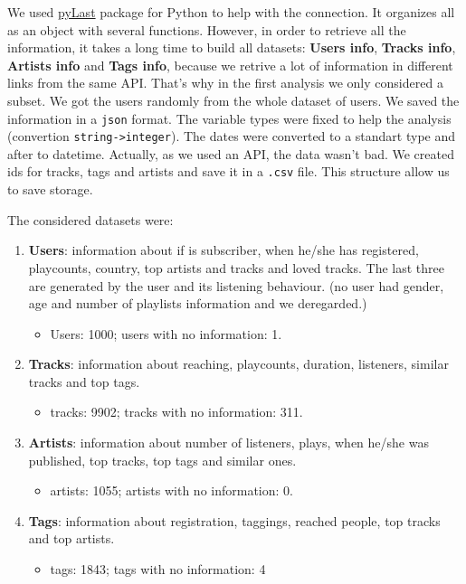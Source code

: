 \documentclass{article}
\begin{document}
We used \href{https://github.com/pylast/pylast}{pyLast}
package for Python to help with the connection. It organizes all as an object
with several functions. However, in order to retrieve all the information, it
takes a long time to build all datasets: \textbf{Users info}, \textbf{Tracks
info}, \textbf{Artists info} and \textbf{Tags info}, because we retrive a lot
of information in different links from the same API. That's why in the first
analysis we only considered a subset. We got the users randomly from the whole
dataset of users. We saved the information in a \lstinline{json} format. The
variable types were fixed to help the analysis (convertion
\lstinline{string->integer}). The dates were converted to a standart type and
after to datetime. Actually, as we used an API, the data wasn't bad. We
created ids for tracks, tags and artists and save it in a \lstinline{.csv}
file. This structure allow us to save storage. 

The considered datasets were: 

\begin{enumerate}
  \item \textbf{Users}: information about if is subscriber, when he/she 
  has registered, playcounts, country, top artists and tracks and loved
  tracks. The last three are generated by the user and its listening behaviour. (no user had gender, age and number of playlists information and
  we deregarded.) 
  \begin{itemize}
    \item Users: 1000; users with no information: 1.
  \end{itemize}
  \item \textbf{Tracks}: information about reaching, playcounts, duration,
  listeners, similar tracks and top tags.
  \begin{itemize}
    \item tracks: 9902; tracks with no information: 311.
  \end{itemize} 
  \item \textbf{Artists}: information about number of listeners, plays, when
  he/she was published, top tracks, top tags and similar ones.
  \begin{itemize}
    \item artists: 1055; artists with no information: 0.
  \end{itemize}
  \item \textbf{Tags}: information about registration, taggings, reached
  people, top tracks and top artists.
  \begin{itemize}
    \item tags: 1843; tags with no information: 4
  \end{itemize} 
\end{enumerate}
\end{document}
